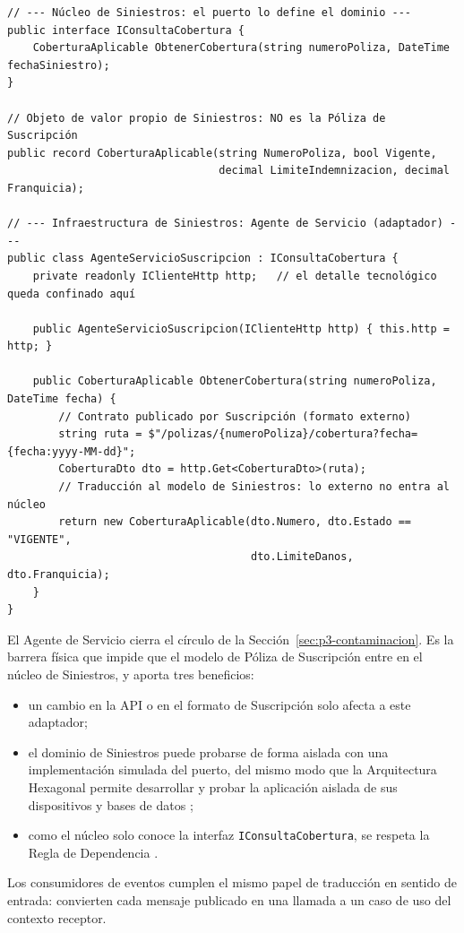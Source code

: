 \begin{lstlisting}[style=codigo, language={[Sharp]C}, float=!tb,
  caption={Esbozo en estilo C\# del puerto y del Agente de Servicio en el contexto de Siniestros.},
  label={lst:p3-agente}]
// --- Núcleo de Siniestros: el puerto lo define el dominio ---
public interface IConsultaCobertura {
    CoberturaAplicable ObtenerCobertura(string numeroPoliza, DateTime fechaSiniestro);
}

// Objeto de valor propio de Siniestros: NO es la Póliza de Suscripción
public record CoberturaAplicable(string NumeroPoliza, bool Vigente,
                                 decimal LimiteIndemnizacion, decimal Franquicia);

// --- Infraestructura de Siniestros: Agente de Servicio (adaptador) ---
public class AgenteServicioSuscripcion : IConsultaCobertura {
    private readonly IClienteHttp http;   // el detalle tecnológico queda confinado aquí

    public AgenteServicioSuscripcion(IClienteHttp http) { this.http = http; }

    public CoberturaAplicable ObtenerCobertura(string numeroPoliza, DateTime fecha) {
        // Contrato publicado por Suscripción (formato externo)
        string ruta = $"/polizas/{numeroPoliza}/cobertura?fecha={fecha:yyyy-MM-dd}";
        CoberturaDto dto = http.Get<CoberturaDto>(ruta);
        // Traducción al modelo de Siniestros: lo externo no entra al núcleo
        return new CoberturaAplicable(dto.Numero, dto.Estado == "VIGENTE",
                                      dto.LimiteDanos, dto.Franquicia);
    }
}
\end{lstlisting}

El Agente de Servicio cierra el círculo de la Sección~\ref{sec:p3-contaminacion}. Es la
barrera física que impide que el modelo de Póliza de Suscripción entre en el núcleo de
Siniestros, y aporta tres beneficios:
\begin{itemize}
  \item un cambio en la API o en el formato de Suscripción solo afecta a este adaptador;
  \item el dominio de Siniestros puede probarse de forma aislada con una implementación
        simulada del puerto, del mismo modo que la Arquitectura Hexagonal permite
        desarrollar y probar la aplicación aislada de sus dispositivos y bases de datos
        \parencite{cockburn2005};
  \item como el núcleo solo conoce la interfaz \texttt{IConsultaCobertura}, se respeta la
        Regla de Dependencia \parencite[203]{martin2017}.
\end{itemize}
Los consumidores de eventos cumplen el mismo papel de traducción en sentido de entrada:
convierten cada mensaje publicado en una llamada a un caso de uso del contexto receptor.

